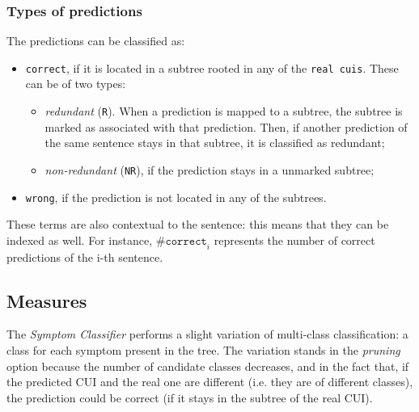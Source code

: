 \subsubsection{Types of predictions}
The predictions can be classified as:
\begin{itemize}
  \item \texttt{correct}, if it is located in a subtree rooted in any of the \texttt{real cuis}. These can be of two types:
    \begin{itemize}
      \item \textit{redundant} (\texttt{R}). When a prediction is mapped to a subtree, the subtree is marked as associated with that prediction. Then, if another prediction of the same sentence stays in that subtree, it is classified as redundant;
      \item \textit{non-redundant} (\texttt{NR}), if the prediction stays in a unmarked subtree;
    \end{itemize}
  \item \texttt{wrong}, if the prediction is not located in any of the subtrees.
\end{itemize}

These terms are also contextual to the sentence: this means that they can be indexed as well. For instance, $\texttt{\#correct}_{i}$ represents the number of correct predictions of the i-th sentence.

\subsection{Measures}
The \textit{Symptom Classifier} performs a slight variation of multi-class classification: a class for each symptom present in the tree. The variation stands in the \textit{pruning} option because the number of candidate classes decreases, and in the fact that, if the predicted CUI and the real one are different (i.e. they are of different classes), the prediction could be correct (if it stays in the subtree of the real CUI).

